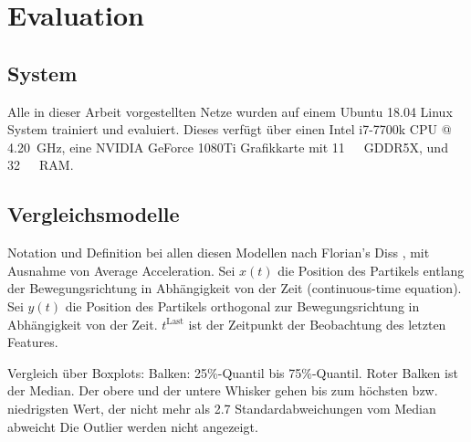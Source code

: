 \chapter{Evaluation}


\section{System}

Alle in dieser Arbeit vorgestellten Netze wurden auf einem Ubuntu 18.04 Linux System trainiert und evaluiert.
Dieses verfügt über einen Intel i7-7700k CPU @ \SI{4.20}{\giga\hertz}, eine NVIDIA GeForce 1080Ti Grafikkarte mit \SI{11}{\giga\byte}~GDDR5X,
und \SI{32}{\giga\byte}~RAM. 


\section{Vergleichsmodelle}

\color{blue}
Notation und Definition bei allen diesen Modellen nach Florian's Diss \cite{Pfaff2018}, mit Ausnahme von Average Acceleration.
Sei \(x(t)\) die Position des Partikels entlang der Bewegungsrichtung in Abhängigkeit von der Zeit
(continuous-time equation).
Sei \( y(t)\) die Position des Partikels orthogonal zur Bewegungsrichtung in Abhängigkeit von der Zeit.
\(t^{\text{Last}}\) ist der Zeitpunkt der Beobachtung des letzten Features.

Vergleich über Boxplots: Balken: 25\%-Quantil bis 75\%-Quantil.
Roter Balken ist der Median. Der obere und der untere Whisker 
gehen bis zum höchsten bzw. niedrigsten Wert, der nicht mehr als 2.7 Standardabweichungen vom Median abweicht
Die Outlier werden nicht angezeigt.

\color{black}

